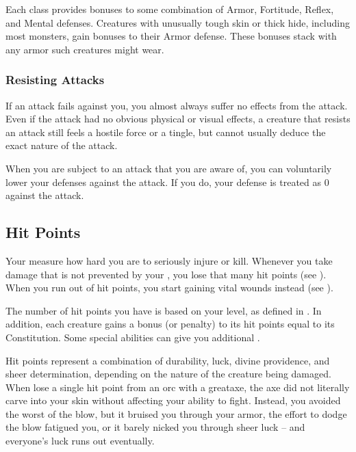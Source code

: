              Each class provides bonuses to some combination of Armor, Fortitude, Reflex, and Mental defenses.
             Creatures with unusually tough skin or thick hide, including most monsters, gain bonuses to their Armor defense.
            These bonuses stack with any armor such creatures might wear.

        \subsubsection{Resisting Attacks}
            If an attack fails against you, you almost always suffer no effects from the attack.
            Even if the attack had no obvious physical or visual effects, a creature that resists an attack still feels a hostile force or a tingle, but cannot usually deduce the exact nature of the attack.

             When you are subject to an attack that you are aware of, you can voluntarily lower your defenses against the attack.
            If you do, your defense is treated as 0 against the attack.

    \subsection{Hit Points}\label{Hit Points}
        Your  measure how hard you are to seriously injure or kill.
        Whenever you take damage that is not prevented by your , you lose that many hit points (see ).
        When you run out of hit points, you start gaining vital wounds instead (see ).

        The number of hit points you have is based on your level, as defined in .
        In addition, each creature gains a bonus (or penalty) to its hit points equal to its Constitution.
        Some special abilities can give you additional .

         Hit points represent a combination of durability, luck, divine providence, and sheer determination, depending on the nature of the creature being damaged.
        When lose a single hit point from an orc with a greataxe, the axe did not literally carve into your skin without affecting your ability to fight.
        Instead, you avoided the worst of the blow, but it bruised you through your armor, the effort to dodge the blow fatigued you, or it barely nicked you through sheer luck -- and everyone's luck runs out eventually.

